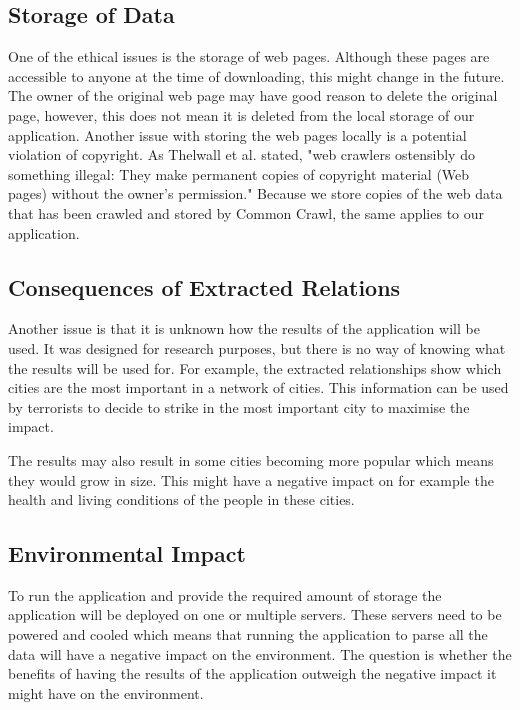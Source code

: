 \subsection{Storage of Data}
One of the ethical issues is the storage of web pages. Although these pages are accessible to anyone at the time of downloading, this might change in the future. The owner of the original web page may have good reason to delete the original page, however, this does not mean it is deleted from the local storage of our application. Another issue with storing the web pages locally is a potential violation of copyright. As Thelwall et al. stated, "web crawlers ostensibly do something illegal: They make permanent copies of copyright material (Web pages) without the owner’s permission."\cite{thelwall2006web} Because we store copies of the web data that has been crawled and stored by Common Crawl, the same applies to our application.

\subsection{Consequences of Extracted Relations}
Another issue is that it is unknown how the results of the application will be used. It was designed for research purposes, but there is no way of knowing what the results will be used for. For example, the extracted relationships show which cities are the most important in a network of cities. This information can be used by terrorists to decide to strike in the most important city to maximise the impact. 

The results may also result in some cities becoming more popular which means they would grow in size. This might have a negative impact on for example the health and living conditions of the people in these cities.

\subsection{Environmental Impact}
To run the application and provide the required amount of storage the application will be deployed on one or multiple servers. These servers need to be powered and cooled which means that running the application to parse all the data will have a negative impact on the environment. The question is whether the benefits of having the results of the application outweigh the negative impact it might have on the environment.
